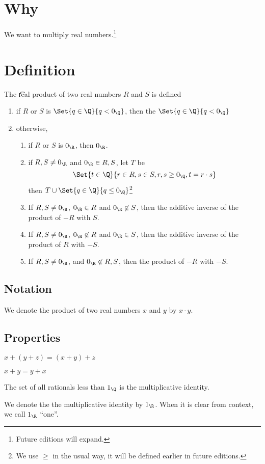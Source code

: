 
\section*{Why}

We want to multiply real numbers.\footnote{Future editions will expand.}

    \section*{Definition}


The \t{real product} of two real numbers $R$ and $S$ is defined
  \begin{enumerate}
    \item if $R$ or $S$ is $\Set{q \in \Q }{q < 0_{\Q }}$, then the $\Set{q \in \Q }{q < 0_{\Q }}$
    \item otherwise,
      \begin{enumerate}
        \item if $R$ or $S$ is $0_{\R }$, then $0_{\R }$.
        \item if $R,S \neq 0_{\R }$ and $0_{\R } \in R, S$, let $T$ be
\[
\Set{t \in \Q }{r \in R, s \in S, r, s \geq 0_{\Q }, t = r\cdot  s}
\]
then $T \cup \Set{q \in \Q }{q \leq 0_{\Q }}$\footnote{We use $\geq$ in the usual way, it will be defined earlier in future editions.}
        \item If $R, S \neq 0_{\R }$, $0_{\R } \in R$ and $0_{\R } \not\in S$, then the additive inverse of the product of $-R$ with $S$.
        \item If $R, S \neq 0_{\R }$, $0_{\R } \not\in R$ and $0_{\R } \in S$, then the additive inverse of the product of $R$ with $-S$.
        \item If $R, S \neq 0_{\R }$, and $0_{\R } \not\in R,S$, then the product of $-R$ with $-S$.
      \end{enumerate}
  \end{enumerate}

\subsection*{Notation}

We denote the product of two real numbers $x$ and $y$ by $x \cdot  y$.

\subsection*{Properties}

\begin{proposition}[Associative]
$x + (y + z) = (x + y) + z$
\end{proposition}

\begin{proposition}[Commutative]
$x + y = y + x$
\end{proposition}

\begin{proposition}[Identity]
The set of all rationals less than $1_{\Q }$ is the multiplicative identity.
\end{proposition}

We denote the the multiplicative identity by $1_{\R }$.
When it is clear from context, we call $1_{\R }$ ``one''.
